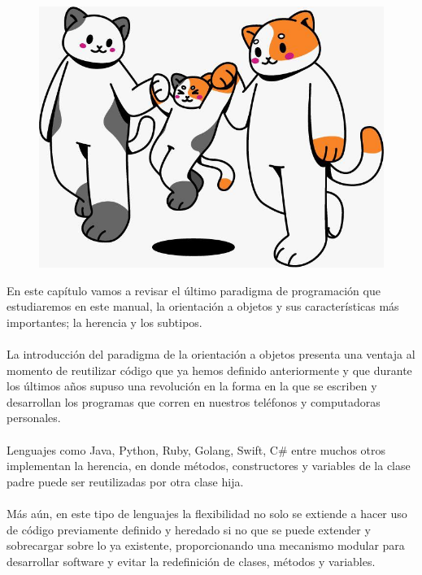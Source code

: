 
\begin{figure}[htbp]
    \centerline{\includegraphics[scale=.5]{assets/10_gatitos_familia.jpg}}
\end{figure}

En este capítulo vamos a revisar el último paradigma de programación que estudiaremos en este manual, la orientación a objetos y sus características más importantes; la herencia y los subtipos.\\\\
La introducción del paradigma de la orientación a objetos presenta una ventaja al momento de reutilizar código que ya hemos definido anteriormente y que durante los últimos años supuso una revolución en la forma en la que se escriben y desarrollan los programas que corren en nuestros teléfonos y computadoras personales.\\\\
Lenguajes como \textsf{Java},  \textsf{Python}, \textsf{Ruby}, \textsf{Golang}, \textsf{Swift}, \textsf{C\#} entre muchos otros implementan la herencia, en donde métodos, constructores y variables de la clase padre puede ser reutilizadas por otra clase hija.\\\\
Más aún, en este tipo de lenguajes la flexibilidad no solo se extiende a hacer uso de código previamente definido y heredado si no que se puede extender y sobrecargar sobre lo ya existente, proporcionando una mecanismo modular para desarrollar software y evitar la redefinición de clases, métodos y variables. 

